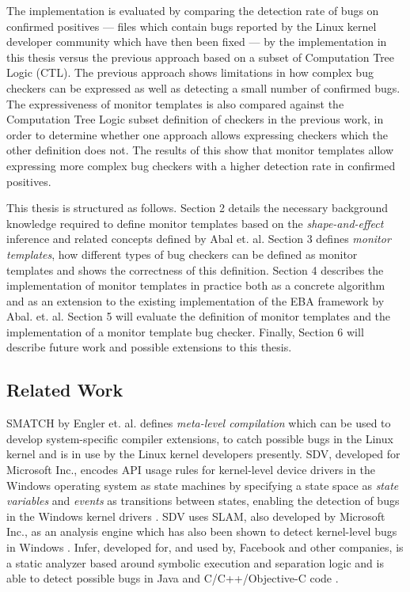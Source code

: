 \newpar The implementation is evaluated by comparing the detection rate of bugs on confirmed positives --- files which contain bugs reported by the Linux kernel developer community which have then been fixed --- by the implementation in this thesis versus the previous approach based on a subset of Computation Tree Logic (CTL). The previous approach shows limitations in how complex bug checkers can be expressed as well as detecting a small number of confirmed bugs. The expressiveness of monitor templates is also compared against the Computation Tree Logic subset definition of checkers in the previous work, in order to determine whether one approach allows expressing checkers which the other definition does not. The results of this show that monitor templates allow expressing more complex bug checkers with a higher detection rate in confirmed positives.   

\newpar This thesis is structured as follows. Section 2 details the necessary background knowledge required to define monitor templates based on the \textit{shape-and-effect} inference and related concepts defined by Abal et. al. Section 3 defines \textit{monitor templates}, how different types of bug checkers can be defined as monitor templates and shows the correctness of this definition. Section 4 describes the implementation of monitor templates in practice both as a concrete algorithm and as an extension to the existing implementation of the EBA framework by Abal. et. al. Section 5 will evaluate the definition of monitor templates and the implementation of a monitor template bug checker. Finally, Section 6 will describe future work and possible extensions to this thesis.    

\subsection{Related Work}
SMATCH by Engler et. al. \cite{smatch} defines \textit{meta-level compilation} which can be used to develop system-specific compiler extensions, to catch possible bugs in the Linux kernel and is in use by the Linux kernel developers presently. SDV, developed for Microsoft Inc., encodes API usage rules for kernel-level device drivers in the Windows operating system as state machines by specifying a state space as \textit{state variables} and \textit{events} as transitions between states, enabling the detection of bugs in the Windows kernel drivers \cite{SDV}. SDV uses SLAM, also developed by Microsoft Inc., as an analysis engine which has also been shown to detect kernel-level bugs in Windows \cite{SLAM}. Infer, developed for, and used by, Facebook and other companies, is a static analyzer based around symbolic execution and separation logic and is able to detect possible bugs in Java and C/C++/Objective-C code \cite{infer}.